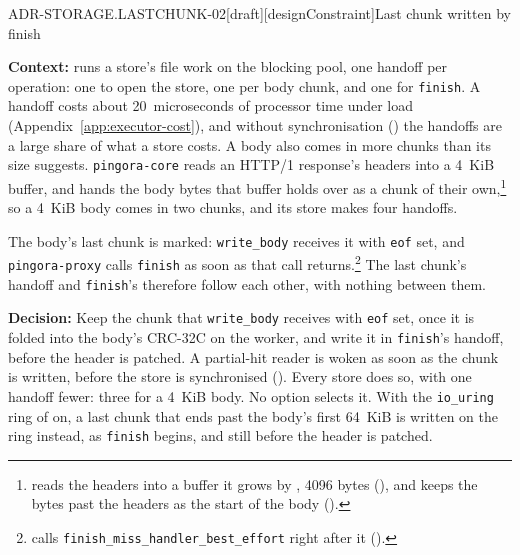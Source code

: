 \begin{requirement}{ADR-STORAGE.LASTCHUNK-02}[draft][designConstraint]{Last chunk written by finish}


  \textbf{Context:}  runs a store's file
  work on the blocking pool, one handoff per operation: one to open the
  store, one per body chunk, and one for \texttt{finish}. A handoff costs
  about 20~microseconds of processor time under load
  (Appendix~\ref{app:executor-cost}), and without synchronisation
  () the handoffs are a large share of
  what a store costs. A body also comes in more chunks than its size
  suggests. \texttt{pingora-core} reads an HTTP/1 response's headers into a
  4~KiB buffer, and hands the body bytes that buffer holds over as a chunk
  of their
  own,\footnote{
  reads the headers into a buffer it grows by
  ,
  4096 bytes (),
  and keeps the bytes past the headers as the start of the body
  ().} so a
  4~KiB body comes in two chunks, and its store makes four handoffs.

  The body's last chunk is marked: \texttt{write\_body} receives it with
  \texttt{eof} set, and \texttt{pingora-proxy} calls \texttt{finish} as soon
  as that call returns.\footnote{
  calls \texttt{finish\_miss\_handler\_best\_effort} right after it
  ().} The last chunk's
  handoff and \texttt{finish}'s therefore follow each other, with nothing
  between them.

  \textbf{Decision:} Keep the chunk that \texttt{write\_body} receives with
  \texttt{eof} set, once it is folded into the body's CRC-32C on the worker,
  and write it in \texttt{finish}'s handoff, before the header is patched. A
  partial-hit reader is woken as soon as the chunk is written, before the
  store is synchronised (). Every store does
  so, with one handoff fewer: three for a 4~KiB body. No option selects it.
  With the \texttt{io\_uring} ring of  on, a
  last chunk that ends past the body's first 64~KiB is written on the ring
  instead, as \texttt{finish} begins, and still before the header is
  patched.


\end{requirement}
